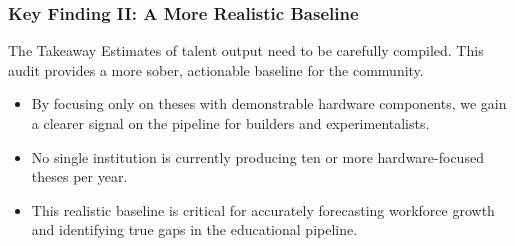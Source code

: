 \documentclass[aspectratio=169]{beamer}
\begin{document}
\begin{frame}
    \frametitle{Key Finding II: A More Realistic Baseline}
    
    \begin{alertblock}{The Takeaway}
        Estimates of talent output need to be carefully compiled. This audit provides a more sober, actionable baseline for the community.
    \end{alertblock}
    
    \begin{itemize}
        \item By focusing only on theses with demonstrable hardware components, we gain a clearer signal on the pipeline for builders and experimentalists.
        \item No single institution is currently producing ten or more hardware-focused theses per year.
        \item This realistic baseline is critical for accurately forecasting workforce growth and identifying true gaps in the educational pipeline.
    \end{itemize}
\end{frame}
\end{document}
